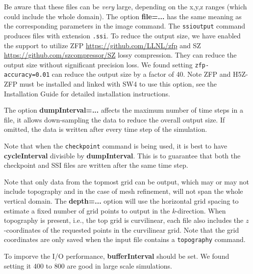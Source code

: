 \documentclass[11pt]{report}
\begin{document}
Be aware that these files can be {\em very} large, depending on the
  x,y,z ranges (which could include the whole domain).
The option {\bf file=...} has the
  same meaning as the corresponding parameters in the image command.
The \verb+ssioutput+ command produces files with extension \verb+.ssi+.
To reduce the output size, we have enabled the support to utilize ZFP \url{https://github.com/LLNL/zfp} and SZ \url{https://github.com/szcompressor/SZ} lossy compression. They can reduce the output size without significant precision loss. We found setting \verb+zfp-accuracy=0.01+ can reduce the output size by a factor of 40. Note ZFP and H5Z-ZFP must be installed and linked with SW4 to use this option, see the Installation Guide for detailed installation instructions.


The option {\bf dumpInterval=...} affects the maximum 
number of time steps in a file, it allows down-sampling the data to reduce the overall output size. If omitted, the data is written after every time step of the simulation.

Note that when the \verb+checkpoint+ command is being used, it is best to have {\bf cycleInterval} divisible by  {\bf dumpInterval}. This is to guarantee that both the checkpoint and SSI files are written after the same time step.

Note that only data from the topmost grid can be output, which may or may
  not include topography and in the case of mesh refinement, will not
  span the whole vertical domain.
The {\bf depth=...} option will use the horizontal grid spacing to estimate a 
  fixed number of grid points to output in the {\emph k-}direction.
When topography is present, i.e., the top grid is curvilinear, each file also 
  includes the $z$-coordinates of the requested points in the curvilinear grid.
Note that the grid coordinates are only saved when the
  input file contains a \verb+topography+ command.

To imporve the I/O performance, {\bf bufferInterval} should be set. We found setting it 400 to 800 are good in large scale simulations.
\end{document}

